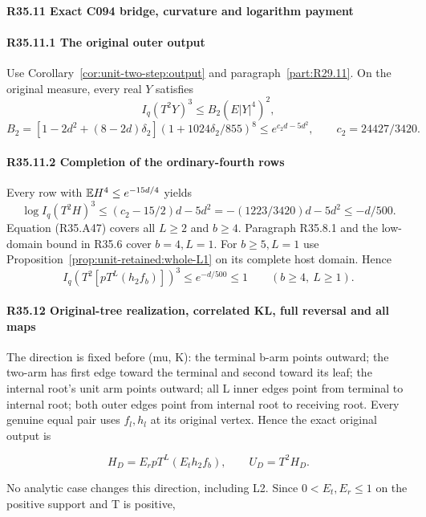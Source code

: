 \paragraph{R35.11 Exact C094 bridge, curvature and logarithm payment}

\paragraph{R35.11.1 The original outer output}
Use Corollary~\ref{cor:unit-two-step:output} and
paragraph~\ref{part:R29.11}. On the original measure, every real
$Y$ satisfies
\[
 I_q(T^2Y)^3\le B_2(E|Y|^4)^2,\tag{R35.A61}
\]
\[
 B_2=[1-2d^2+(8-2d)\delta_2](1+1024\delta_2/855)^8
       \le e^{c_2d-5d^2},\qquad c_2=24427/3420.\tag{R35.A62}
\]

\paragraph{R35.11.2 Completion of the ordinary-fourth rows}
Every row with $\mathbb E H^4\le e^{-15d/4}$ yields
\[
 \log I_q(T^2H)^3\le(c_2-15/2)d-5d^2
 =-(1223/3420)d-5d^2\le-d/500.\tag{R35.A63}
\]
Equation (R35.A47) covers all $L\ge2$ and $b\ge4$.
Paragraph R35.8.1 and the low-domain bound in R35.6 cover $b=4,L=1$.
For $b\ge5,L=1$ use Proposition~\ref{prop:unit-retained:whole-L1}
on its complete host domain. Hence
\begin{equation}\tag{R35.A68}
 I_q(T^2[pT^L(h_2f_b)])^3\le e^{-d/500}\le1
 \qquad(b\ge4,\ L\ge1).
\end{equation}

\paragraph{R35.12 Original-tree realization, correlated KL, full reversal and all maps}

The direction is fixed before (mu, K):
the terminal b-arm points outward;
the two-arm has first edge toward the terminal and second toward its leaf;
the internal root's unit arm points outward;
all L inner edges point from terminal to internal root;
both outer edges point from internal root to receiving root.
Every genuine equal pair uses \(f_l,\allowbreak  h_l\) at its original vertex.
Hence the exact original output is

\[
H_D=E_rpT^L(E_t h_2f_b),\qquad U_D=T^2H_D.
\]

No analytic case changes this direction, including L2.
Since \(0<E_t,\allowbreak  E_r\le 1\) on the positive support and T is positive,

